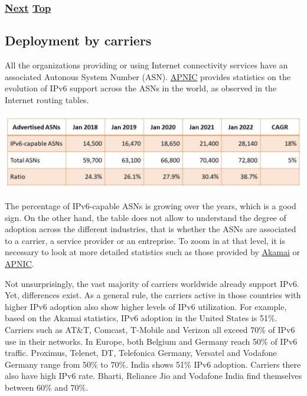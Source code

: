 \documentclass[
]{article}
\begin{document}
\subsubsection{\texorpdfstring{\hyperref[deployment-by-carriers]{Next}
\hyperref[deployment-status]{Top}}{Next Top}}\label{next-top-5}

\pagebreak

\subsection{Deployment by carriers}\label{deployment-by-carriers}

All the organizations providing or using Internet connectivity services
have an associated Autonous System Number (ASN).
\href{https://blog.apnic.net/2022/01/06/bgp-in-2021-the-bgp-table/}{APNIC}
provides statistics on the evolution of IPv6 support across the ASNs in
the world, as observed in the Internet routing tables.

\includegraphics{Section5_Table2.jpg}

The percentage of IPv6-capable ASNs is growing over the years, which is
a good sign. On the other hand, the table does not allow to understand
the degree of adoption across the different industries, that is whether
the ASNs are associated to a carrier, a service provider or an
entreprise. To zoom in at that level, it is necessary to look at more
detailed statistics such as those provided by
\href{https://www.akamai.com/internet-station/cyber-attacks/state-of-the-internet-report/ipv6-adoption-visualization}{Akamai}
or \href{https://stats.labs.apnic.net}{APNIC}.

Not unsurprisingly, the vast majority of carriers worldwide already
support IPv6. Yet, differences exist. As a general rule, the carriers
active in those countries with higher IPv6 adoption also show higher
levels of IPv6 utilization. For example, based on the Akamai statistics,
IPv6 adoption in the United States is 51\%. Carriers such as AT\&T,
Comcast, T-Mobile and Verizon all exceed 70\% of IPv6 use in their
networks. In Europe, both Belgium and Germany reach 50\% of IPv6
traffic. Proximus, Telenet, DT, Telefonica Germany, Versatel and
Vodafone Germany range from 50\% to 70\%. India shows 51\% IPv6
adoption. Carriers there also have high IPv6 rate. Bharti, Reliance Jio
and Vodafone India find themselves between 60\% and 70\%.
\end{document}
